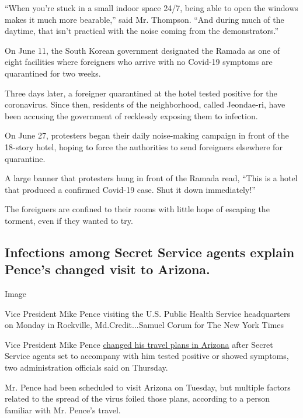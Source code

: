 ``When you're stuck in a small indoor space 24/7, being able to open the
windows makes it much more bearable,'' said Mr. Thompson. ``And during
much of the daytime, that isn't practical with the noise coming from the
demonstrators.''

On June 11, the South Korean government designated the Ramada as one of
eight facilities where foreigners who arrive with no Covid-19 symptoms
are quarantined for two weeks.

Three days later, a foreigner quarantined at the hotel tested positive
for the coronavirus. Since then, residents of the neighborhood, called
Jeondae-ri, have been accusing the government of recklessly exposing
them to infection.

On June 27, protesters began their daily noise-making campaign in front
of the 18-story hotel, hoping to force the authorities to send
foreigners elsewhere for quarantine.

A large banner that protesters hung in front of the Ramada read, ``This
is a hotel that produced a confirmed Covid-19 case. Shut it down
immediately!''

The foreigners are confined to their rooms with little hope of escaping
the torment, even if they wanted to try.

\hypertarget{infections-among-secret-service-agents-explain-pences-changed-visit-to-arizona}{%
\subsection{Infections among Secret Service agents explain Pence's
changed visit to
Arizona.}\label{infections-among-secret-service-agents-explain-pences-changed-visit-to-arizona}}

Image

Vice President Mike Pence visiting the U.S. Public Health Service
headquarters on Monday in Rockville, Md.Credit...Samuel Corum for The
New York Times

Vice President Mike Pence
\href{https://www.nytimes3xbfgragh.onion/2020/07/02/us/politics/pence-postponed-arizona-trip-virus.html}{changed
his travel plans in Arizona} after Secret Service agents set to
accompany with him tested positive or showed symptoms, two
administration officials said on Thursday.

Mr. Pence had been scheduled to visit Arizona on Tuesday, but multiple
factors related to the spread of the virus foiled those plans, according
to a person familiar with Mr. Pence's travel.

